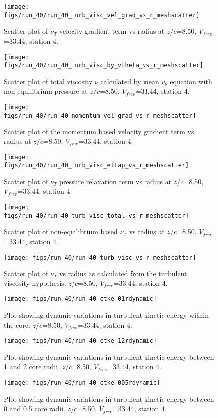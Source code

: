 \begin{figure}[H]
\centering
\texttt{[image: figs/run\_40/run\_40\_turb\_visc\_vel\_grad\_vs\_r\_meshscatter]}
\caption{Scatter plot of $\nu_T$ velocity gradient term vs radius at $z/c$=8.50, $V_{free}$=33.44, station 4.}
\end{figure}


\begin{figure}[H]
\centering
\texttt{[image: figs/run\_40/run\_40\_turb\_visc\_by\_vtheta\_vs\_r\_meshscatter]}
\caption{Scatter plot of total viscosity $\nu$ calculated by mean $\bar{v}_{\theta}$ equation with non-equilibrium pressure at $z/c$=8.50, $V_{free}$=33.44, station 4.}
\end{figure}


\begin{figure}[H]
\centering
\texttt{[image: figs/run\_40/run\_40\_momentum\_vel\_grad\_vs\_r\_meshscatter]}
\caption{Scatter plot of the momentum based velocity gradient term vs radius at $z/c$=8.50, $V_{free}$=33.44, station 4.}
\end{figure}


\begin{figure}[H]
\centering
\texttt{[image: figs/run\_40/run\_40\_turb\_visc\_ettap\_vs\_r\_meshscatter]}
\caption{Scatter plot of $\nu_T$ pressure relaxation term vs radius at $z/c$=8.50, $V_{free}$=33.44, station 4.}
\end{figure}


\begin{figure}[H]
\centering
\texttt{[image: figs/run\_40/run\_40\_turb\_visc\_total\_vs\_r\_meshscatter]}
\caption{Scatter plot of non-equilibrium based $\nu_T$ vs radius at $z/c$=8.50, $V_{free}$=33.44, station 4.}
\end{figure}


\begin{figure}[H]
\centering
\texttt{[image: figs/run\_40/run\_40\_turb\_visc\_vs\_r\_meshscatter]}
\caption{Scatter plot of $\nu_T$ vs radius as calculated from the turbulent viscosity hypothesis. $z/c$=8.50, $V_{free}$=33.44, station 4.}
\end{figure}


\begin{figure}[H]
\centering
\texttt{[image: figs/run\_40/run\_40\_ctke\_01rdynamic]}
\caption{Plot showing dynamic variations in turbulent kinetic energy within the core. $z/c$=8.50, $V_{free}$=33.44, station 4.}
\end{figure}


\begin{figure}[H]
\centering
\texttt{[image: figs/run\_40/run\_40\_ctke\_12rdynamic]}
\caption{Plot showing dynamic variations in turbulent kinetic energy between 1 and 2 core radii. $z/c$=8.50, $V_{free}$=33.44, station 4.}
\end{figure}


\begin{figure}[H]
\centering
\texttt{[image: figs/run\_40/run\_40\_ctke\_005rdynamic]}
\caption{Plot showing dynamic variations in turbulent kinetic energy between 0 and 0.5 core radii. $z/c$=8.50, $V_{free}$=33.44, station 4.}
\end{figure}


